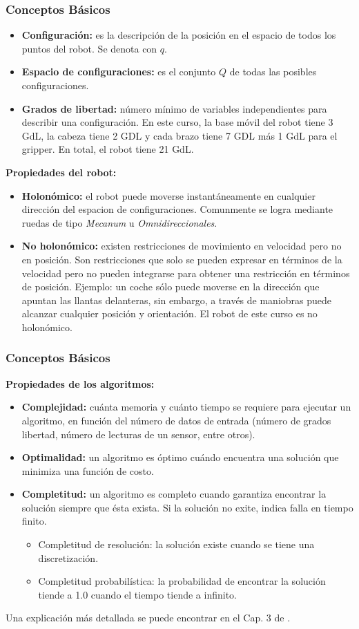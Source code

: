 \documentclass[10pt,spanish,aspectratio=1610]{beamer}
\begin{document}
\begin{frame}\frametitle{Conceptos Básicos}
  \begin{itemize}
  \item \textbf{Configuración:} es la descripción de la posición en el espacio de todos los puntos del robot. Se denota con $q$.
  \item \textbf{Espacio de configuraciones:} es el conjunto $Q$ de todas las posibles configuraciones. 
  \item \textbf{Grados de libertad:} número mínimo de variables independientes para describir una configuración. En este curso, la base móvil del robot tiene 3 GdL, la cabeza tiene 2 GDL y cada brazo tiene 7 GDL más 1 GdL para el gripper. En total, el robot tiene 21 GdL. 
  \end{itemize}
  \textbf{Propiedades del robot:}
  \begin{itemize}
  \item \textbf{Holonómico:} el robot puede moverse instantáneamente en cualquier dirección del espacion de configuraciones. Comunmente se logra mediante ruedas de tipo \textit{Mecanum} u \textit{Omnidireccionales}. 
  \item \textbf{No holonómico:} existen restricciones de movimiento en velocidad pero no en posición. Son restricciones que solo se pueden expresar en términos de la velocidad pero no pueden integrarse para obtener una restricción en términos de posición. Ejemplo: un coche sólo puede moverse en la dirección que apuntan las llantas delanteras, sin embargo, a través de maniobras puede alcanzar cualquier posición y orientación. El robot de este curso es no holonómico. 
  \end{itemize}
\end{frame}

\begin{frame}\frametitle{Conceptos Básicos}
  \textbf{Propiedades de los algoritmos:}
  \begin{itemize}
  \item \textbf{Complejidad:} cuánta memoria y cuánto tiempo se requiere para ejecutar un algoritmo, en función del número de datos de entrada (número de grados libertad, número de lecturas de un sensor, entre otros).
  \item \textbf{Optimalidad:} un algoritmo es óptimo cuándo encuentra una solución que minimiza una función de costo.
  \item \textbf{Completitud:} un algoritmo es completo cuando garantiza encontrar la solución siempre que ésta exista. Si la solución no exite, indica falla en tiempo finito.
    \begin{itemize}
    \item Completitud de resolución: la solución existe cuando se tiene una discretización. 
    \item Completitud probabilística: la probabilidad de encontrar la solución tiende a 1.0 cuando el tiempo tiende a infinito.
    \end{itemize}
  \end{itemize}
  Una explicación más detallada se puede encontrar en el Cap. 3 de \cite{choset2005principles}.
\end{frame}
\end{document}
